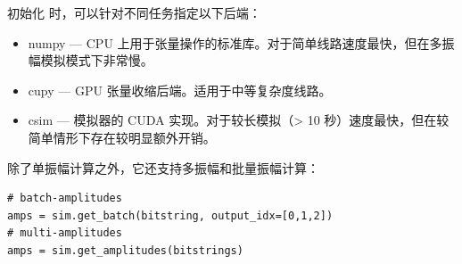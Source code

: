 初始化  时，可以针对不同任务指定以下后端：
\begin{itemize}
    \item numpy --- CPU 上用于张量操作的标准库。对于简单线路速度最快，但在多振幅模拟模式下非常慢。
    \item cupy --- GPU 张量收缩后端。适用于中等复杂度线路。
    \item csim --- 模拟器的 CUDA 实现。对于较长模拟（> 10 秒）速度最快，但在较简单情形下存在较明显额外开销。
\end{itemize}

除了单振幅计算之外，它还支持多振幅和批量振幅计算：
\begin{lstlisting}
# batch-amplitudes
amps = sim.get_batch(bitstring, output_idx=[0,1,2])
# multi-amplitudes
amps = sim.get_amplitudes(bitstrings)
\end{lstlisting}
